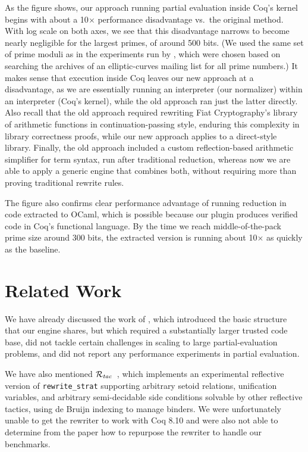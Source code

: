 \documentclass[sigplan,10pt,review,anonymous]{acmart}\settopmatter{printfolios=true,printccs=false,printacmref=false}
\newcommand{\Rtac}{\ensuremath{\mathcal{R}_\text{\emph{tac}}}}
\begin{document}
As the figure shows, our approach running partial evaluation inside Coq's kernel begins with about a 10$\times$ performance disadvantage vs.\ the original method.
With log scale on both axes, we see that this disadvantage narrows to become nearly negligible for the largest primes, of around 500 bits.
(We used the same set of prime moduli as in the experiments run by \citet{FiatCryptoSP19}, which were chosen based on searching the archives of an elliptic-curves mailing list for all prime numbers.)
It makes sense that execution inside Coq leaves our new approach at a disadvantage, as we are essentially running an interpreter (our normalizer) within an interpreter (Coq's kernel), while the old approach ran just the latter directly.
Also recall that the old approach required rewriting Fiat Cryptography's library of arithmetic functions in continuation-passing style, enduring this complexity in library correctness proofs, while our new approach applies to a direct-style library.
Finally, the old approach included a custom reflection-based arithmetic simplifier for term syntax, run after traditional reduction, whereas now we are able to apply a generic engine that combines both, without requiring more than proving traditional rewrite rules.

The figure also confirms clear performance advantage of running reduction in code extracted to OCaml, which is possible because our plugin produces verified code in Coq's functional language.
By the time we reach middle-of-the-pack prime size around 300 bits, the extracted version is running about 10$\times$ as quickly as the baseline.


\section{Related Work}\label{sec:related}

We have already discussed the work of \citet{Aehlig}, which introduced the basic structure that our engine shares, but which required a substantially larger trusted code base, did not tackle certain challenges in scaling to large partial-evaluation problems, and did not report any performance experiments in partial evaluation.

We have also mentioned \Rtac{}~\cite{rtac}, which implements an experimental reflective version of \texttt{rewrite\_strat} supporting arbitrary setoid relations, unification variables, and arbitrary semi-decidable side conditions solvable by other reflective tactics, using de Bruijn indexing to manage binders.
We were unfortunately unable to get the rewriter to work with Coq 8.10 and were also not able to determine from the paper how to repurpose the rewriter to handle our benchmarks.
\end{document}
